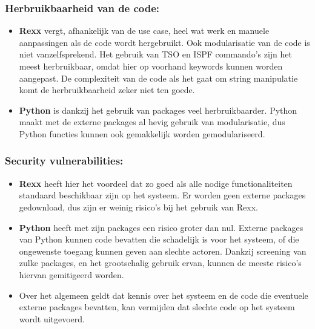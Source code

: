 \subsubsection{Herbruikbaarheid van de code:}
\begin{itemize}
    \item \textbf{Rexx} vergt, afhankelijk van de use case, heel wat werk en manuele aanpassingen als de code wordt hergebruikt. Ook modularisatie van de code is niet vanzelfsprekend. Het gebruik van TSO en ISPF commando's zijn het meest herbruikbaar, omdat hier op voorhand keywords kunnen worden aangepast. De complexiteit van de code als het gaat om string manipulatie komt de herbruikbaarheid zeker niet ten goede.
    \item \textbf{Python} is dankzij het gebruik van packages veel herbruikbaarder. Python maakt met de externe packages al hevig gebruik van modularisatie, dus Python functies kunnen ook gemakkelijk worden gemodulariseerd.
\end{itemize}
 
\subsubsection{Security vulnerabilities:}
\begin{itemize}
    \item \textbf{Rexx} heeft hier het voordeel dat zo goed als alle nodige functionaliteiten standaard beschikbaar zijn op het systeem. Er worden geen externe packages gedownload, dus zijn er weinig risico's bij het gebruik van Rexx.
    \item \textbf{Python} heeft met zijn packages een risico groter dan nul. Externe packages van Python kunnen code bevatten die schadelijk is voor het systeem, of die ongewenste toegang kunnen geven aan slechte actoren. Dankzij screening van zulke packages, en het grootschalig gebruik ervan, kunnen de meeste risico's hiervan gemitigeerd worden.
    \item Over het algemeen geldt dat kennis over het systeem en de code die eventuele externe packages bevatten, kan vermijden dat slechte code op het systeem wordt uitgevoerd.  
\end{itemize}

